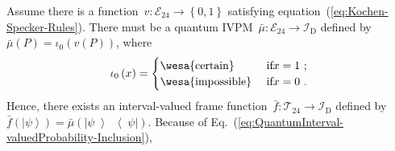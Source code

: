\documentclass[english,reprint, aps, prl,superscriptaddress, showpacs,
showkeys]{revtex4-1}
\theoremstyle{plain}
\theoremstyle{definition}
\newcommand{\events}{\ensuremath{\mathcal{E}}}
\newcommand{\imposs}{{\mbox{\wesa{impossible}}}}
\newcommand{\necess}{{\mbox{\wesa{certain}}}}
\newcommand{\ket}[1]{{\left\vert{#1}\right\rangle}}
\newcommand{\op}[2]{\ensuremath{\left\vert{#1}\middle\rangle\middle\langle{#2}\right\vert}}
\newcommand{\proj}[1]{\op{#1}{#1}}
\begin{document}
Assume there is a function~$v:\events_{24}\rightarrow\left\{ 0,1\right\} $
satisfying equation~(\ref{eq:Kochen-Specker-Rules}). There must
be a quantum IVPM~$\bar{\mu}:\events_{24}\rightarrow\mathscr{I}_{\mathrm{D}}$
defined by $\bar{\mu}\left(P\right)=\iota_{0}\left(v\left(P\right)\right)$,
where 
\begin{equation}
\iota_{0}\left(x\right)=\begin{cases}
\necess & \text{ if}x=1\text{ ;}\\
\imposs & \text{ if}x=0\text{ .}
\end{cases}\label{eq:homomorphism-0}
\end{equation}
Hence, there exists an interval-valued frame function~$\bar{f}:\mathcal{T}_{24}\rightarrow\mathscr{I}_{\mathrm{D}}$
defined by $\bar{f}\left(\ket{\psi}\right)=\bar{\mu}\left(\proj{\psi}\right)$.
Because of Eq.~(\ref{eq:QuantumInterval-valuedProbability-Inclusion}),
\end{document}
